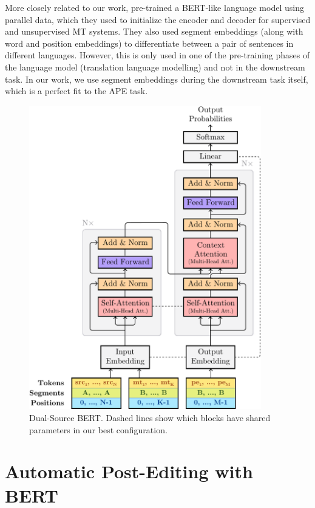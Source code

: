 More closely related to our work, \citet{lample2019xlm}
pre-trained a BERT-like language model using parallel data, which
they used to initialize the encoder and decoder for supervised and
unsupervised MT systems. They also used segment embeddings (along
with word and position embeddings) to differentiate between a pair of
sentences in different languages. However, this is only used in one
of the pre-training phases of the language model (translation
language modelling) and not in the downstream task. In our work, we
use segment embeddings during the downstream task itself, which is a
perfect fit to the APE task.

\begin{figure}[ht!]
    \centering
    \includegraphics[width=0.9\textwidth]{Figures/bert-ape-diagram.pdf}
    \caption{Dual-Source BERT. Dashed lines show which blocks have shared parameters in our best configuration.}
    \label{fig:transformer_diagram}
\end{figure}

\section{Automatic Post-Editing with BERT}\label{sec:ape_bert}


